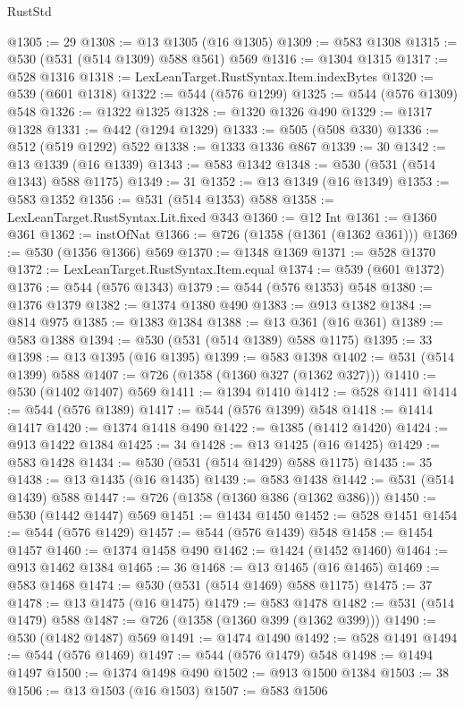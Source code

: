 \begin{lexlean}{RustStd}
\begin{coremodule}
{\begin{coremodule}
{{{{{{{{{{{{{{@1305 := 29
@1308 := @13 @1305 (@16 @1305)
@1309 := @583 @1308
@1315 := @530 (@531 (@514 @1309) @588 @561) @569
@1316 := @1304 @1315
@1317 := @528 @1316
@1318 := LexLeanTarget.RustSyntax.Item.indexBytes
@1320 := @539 (@601 @1318)
@1322 := @544 (@576 @1299)
@1325 := @544 (@576 @1309) @548
@1326 := @1322 @1325
@1328 := @1320 @1326 @490
@1329 := @1317 @1328
@1331 := @442 (@1294 @1329)
@1333 := @505 (@508 @330)
@1336 := @512 (@519 @1292) @522
@1338 := @1333 @1336 @867
@1339 := 30
@1342 := @13 @1339 (@16 @1339)
@1343 := @583 @1342
@1348 := @530 (@531 (@514 @1343) @588 @1175)
@1349 := 31
@1352 := @13 @1349 (@16 @1349)
@1353 := @583 @1352
@1356 := @531 (@514 @1353) @588
@1358 := LexLeanTarget.RustSyntax.Lit.fixed @343
@1360 := @12 Int
@1361 := @1360 @361
@1362 := instOfNat
@1366 := @726 (@1358 (@1361 (@1362 @361)))
@1369 := @530 (@1356 @1366) @569
@1370 := @1348 @1369
@1371 := @528 @1370
@1372 := LexLeanTarget.RustSyntax.Item.equal
@1374 := @539 (@601 @1372)
@1376 := @544 (@576 @1343)
@1379 := @544 (@576 @1353) @548
@1380 := @1376 @1379
@1382 := @1374 @1380 @490
@1383 := @913 @1382
@1384 := @814 @975
@1385 := @1383 @1384
@1388 := @13 @361 (@16 @361)
@1389 := @583 @1388
@1394 := @530 (@531 (@514 @1389) @588 @1175)
@1395 := 33
@1398 := @13 @1395 (@16 @1395)
@1399 := @583 @1398
@1402 := @531 (@514 @1399) @588
@1407 := @726 (@1358 (@1360 @327 (@1362 @327)))
@1410 := @530 (@1402 @1407) @569
@1411 := @1394 @1410
@1412 := @528 @1411
@1414 := @544 (@576 @1389)
@1417 := @544 (@576 @1399) @548
@1418 := @1414 @1417
@1420 := @1374 @1418 @490
@1422 := @1385 (@1412 @1420)
@1424 := @913 @1422 @1384
@1425 := 34
@1428 := @13 @1425 (@16 @1425)
@1429 := @583 @1428
@1434 := @530 (@531 (@514 @1429) @588 @1175)
@1435 := 35
@1438 := @13 @1435 (@16 @1435)
@1439 := @583 @1438
@1442 := @531 (@514 @1439) @588
@1447 := @726 (@1358 (@1360 @386 (@1362 @386)))
@1450 := @530 (@1442 @1447) @569
@1451 := @1434 @1450
@1452 := @528 @1451
@1454 := @544 (@576 @1429)
@1457 := @544 (@576 @1439) @548
@1458 := @1454 @1457
@1460 := @1374 @1458 @490
@1462 := @1424 (@1452 @1460)
@1464 := @913 @1462 @1384
@1465 := 36
@1468 := @13 @1465 (@16 @1465)
@1469 := @583 @1468
@1474 := @530 (@531 (@514 @1469) @588 @1175)
@1475 := 37
@1478 := @13 @1475 (@16 @1475)
@1479 := @583 @1478
@1482 := @531 (@514 @1479) @588
@1487 := @726 (@1358 (@1360 @399 (@1362 @399)))
@1490 := @530 (@1482 @1487) @569
@1491 := @1474 @1490
@1492 := @528 @1491
@1494 := @544 (@576 @1469)
@1497 := @544 (@576 @1479) @548
@1498 := @1494 @1497
@1500 := @1374 @1498 @490
@1502 := @913 @1500 @1384
@1503 := 38
@1506 := @13 @1503 (@16 @1503)
@1507 := @583 @1506
}}}}}}}}}}}}}}
\end{coremodule}}
\end{coremodule}
\end{lexlean}
